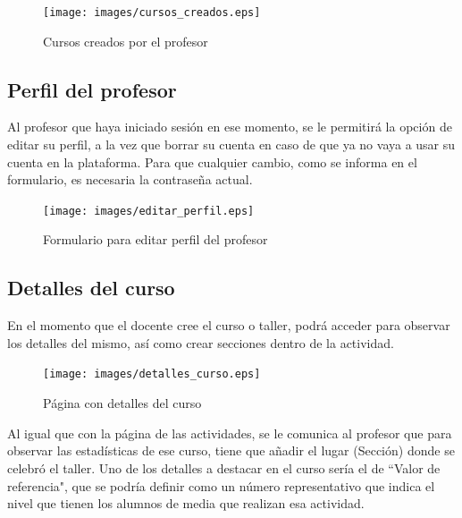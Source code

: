 \begin{figure}[!th]
\begin{center}
\texttt{[image: images/cursos\_creados.eps]}
\caption{Cursos creados por el profesor}
\label{fig:14}
\end{center}
\end{figure}


\subsection{Perfil del profesor}
\label{1:sec:4}

Al profesor que haya iniciado sesión en ese momento, se le permitirá la opción de editar su perfil, a la vez que borrar su cuenta en caso de que ya no vaya a usar su cuenta en la plataforma.
Para que cualquier cambio, como se informa en el formulario, es necesaria la contraseña actual.

\begin{figure}[!th]
\begin{center}
\texttt{[image: images/editar\_perfil.eps]}
\caption{Formulario para editar perfil del profesor}
\label{fig:15}
\end{center}
\end{figure}


\newpage
\subsection{Detalles del curso}
\label{1:sec:5}

En el momento que el docente cree el curso o taller, podrá acceder para observar los detalles del mismo, así como crear secciones dentro de la actividad.

\begin{figure}[!th]
\begin{center}
\texttt{[image: images/detalles\_curso.eps]}
\caption{Página con detalles del curso}
\label{fig:16}
\end{center}
\end{figure}

Al igual que con la página de las actividades, se le comunica al profesor que para observar las estadísticas de ese curso, tiene que añadir el lugar (Sección) donde se celebró el taller.
Uno de los detalles a destacar en el curso sería el de ``Valor de referencia", que se podría definir como un número representativo que indica el nivel que tienen los alumnos de media que realizan
esa actividad.

